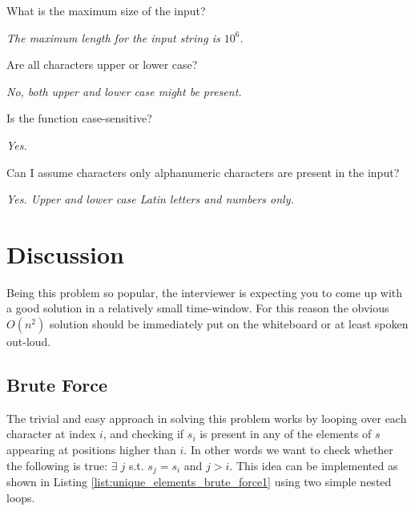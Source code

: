 \begin{QandA}
	\item What is the maximum size of the input?
	\begin{answered}
		\textit{The maximum length for the input string is $10^6$.}
	\end{answered}
	
	\item Are all characters upper or lower case?
	\begin{answered}
		\textit{No, both upper and lower case might be present.}
	\end{answered}

	\item Is the function case-sensitive?
	\begin{answered}
		\textit{Yes.}
	\end{answered}

	\item Can I assume characters only alphanumeric characters are present in the input?
	\begin{answered}
		\textit{Yes. Upper and lower case Latin letters and numbers only.}
	\end{answered}
\end{QandA}

\section{Discussion}
Being this problem so popular, the interviewer is expecting you to come up
with a good solution in a relatively small time-window. 
For this reason the obvious $O(n^2)$ solution should be
immediately put on the whiteboard or at least spoken out-loud.

\subsection{Brute Force}
The trivial and easy approach in solving this problem works by looping over each character at index $i$,
and checking if $s_i$ is present in any of the elements  of $s$ appearing at positions higher than $i$. 
In other words we want to check whether the following is true: $\exists \; j $ s.t.  $s_j=s_i$ and $j>i$.
This idea can be implemented as shown in
Listing \ref{list:unique_elements_brute_force1} using two simple nested loops.




